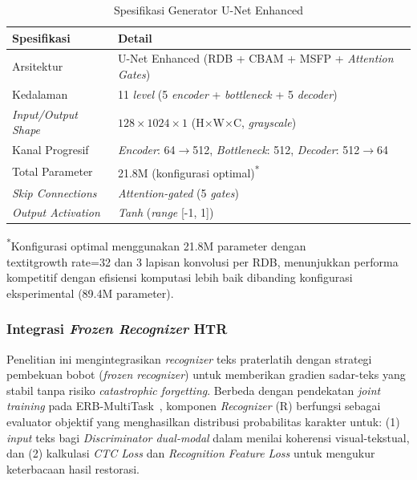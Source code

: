 \begin{table}[H]
\centering
\caption{Spesifikasi Generator U-Net Enhanced}
\label{tab:generator-stats}
\small
\begin{tabular}{|l|l|}
\hline
\textbf{Spesifikasi} & \textbf{Detail} \\
\hline
Arsitektur & U-Net Enhanced (RDB + CBAM + MSFP + \textit{Attention Gates}) \\
\hline
Kedalaman & 11 \textit{level} (5 \textit{encoder} + \textit{bottleneck} + 5 \textit{decoder}) \\
\hline
\textit{Input/Output Shape} & $128 \times 1024 \times 1$ (H$\times$W$\times$C, \textit{grayscale}) \\
\hline
Kanal Progresif & \textit{Encoder}: 64$\rightarrow$512, \textit{Bottleneck}: 512, \textit{Decoder}: 512$\rightarrow$64 \\
\hline
Total Parameter & 21.8M (konfigurasi optimal)\textsuperscript{*} \\
\hline
\textit{Skip Connections} & \textit{Attention-gated} (5 \textit{gates}) \\
\hline
\textit{Output Activation} & \textit{Tanh} (\textit{range} [-1, 1]) \\
\hline
\end{tabular}
\end{table}

\noindent\textsuperscript{*}Konfigurasi optimal menggunakan 21.8M parameter dengan \\textit{growth rate}=32 dan 3 lapisan konvolusi per RDB, menunjukkan performa kompetitif dengan efisiensi komputasi lebih baik dibanding konfigurasi eksperimental (89.4M parameter).

\subsubsection{Integrasi \textit{Frozen Recognizer} HTR} %

Penelitian ini mengintegrasikan \textit{recognizer} teks praterlatih dengan strategi pembekuan bobot (\textit{frozen recognizer}) untuk memberikan gradien sadar-teks yang stabil tanpa risiko \textit{catastrophic forgetting}. Berbeda dengan pendekatan \textit{joint training} pada ERB-MultiTask~\cite{erb2021}, komponen \textit{Recognizer} (R) berfungsi sebagai evaluator objektif yang menghasilkan distribusi probabilitas karakter untuk: (1) \textit{input} teks bagi \textit{Discriminator dual-modal} dalam menilai koherensi visual-tekstual, dan (2) kalkulasi \textit{CTC Loss} dan \textit{Recognition Feature Loss} untuk mengukur keterbacaan hasil restorasi.

